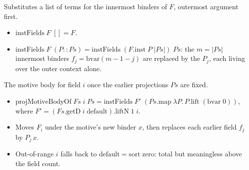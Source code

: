 \begin{definition}
  \label{def:proj-inst-fields}
  \leanok

   Substitutes a list of terms for the innermost binders of $F$, outermost
  argument first.
  \begin{itemize}
  \item $\mathrm{instFields}\;F\;[] = F$.
  \item $\mathrm{instFields}\;F\;(P::Ps) = \mathrm{instFields}\;(F.\mathrm{inst}\;P\;|Ps|)\;Ps$: the
        $m=|Ps|$ innermost binders $f_j=\mathrm{bvar}(m-1-j)$ are replaced by the $P_j$, each
        living over the outer context alone.
  \end{itemize}
\end{definition}

\begin{definition}
  \label{def:proj-motive-body-of}
  \leanok

   The motive body for field $i$ once the earlier projections $Ps$ are fixed.
  \begin{itemize}
  \item $\mathrm{projMotiveBodyOf}\;Fs\;i\;Ps = \mathrm{instFields}\;F'\;(Ps.\mathrm{map}\;\lambda
        P.\,P.\mathrm{lift}\;(\mathrm{bvar}\;0))$, where $F'=(Fs.\mathrm{getD}\;i\;\mathrm{default}).
        \mathrm{liftN}\;1\;i$.
  \item Moves $F_i$ under the motive's new binder $x$, then replaces each earlier field $f_j$ by
        $P_j\,x$.
  \item {} Out-of-range $i$ falls back to $\mathrm{default}=\mathrm{sort}\;\mathrm{zero}$:
        total but meaningless above the field count.
  \end{itemize}
\end{definition}

